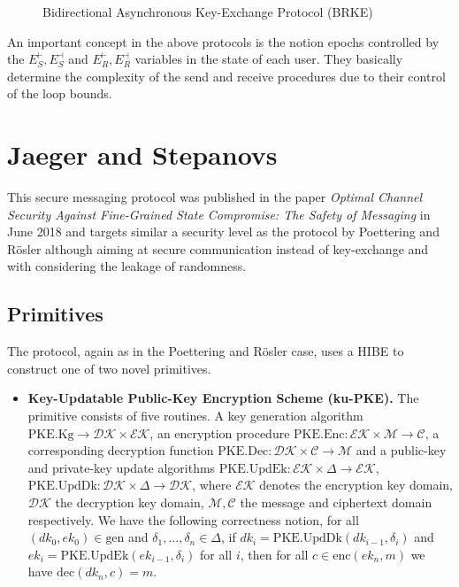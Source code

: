 \documentclass[11pt,a4paper,twoside,openright,bibliography=totoc]{scrbook}
\renewcommand{\t}{\text} %
\begin{document}

\begin{figure}[ht]
  \centering
  \setlength{\fboxsep}{10pt}
  \scalebox{0.9}{%
    \fbox{%
      
    }
  }
  \caption{Bidirectional Asynchronous Key-Exchange Protocol (BRKE)}
  \label{fig:brke}
\end{figure}

An important concept in the above protocols is the notion epochs
controlled by the $E_S^\vdash,E_S^\dashv$ and $E_R^\vdash,E_R^\dashv$
variables in the state of each user. They basically determine
the complexity of the send and receive procedures due to their
control of the loop bounds.


\section[Jaeger and Stepanovs]{Jaeger and Stepanovs~\cite{jaeger2018optimal}}
\label{sec:jaeger-stepanovs}

This secure messaging protocol was published in the paper
\textit{Optimal Channel Security Against Fine-Grained State Compromise: The Safety of Messaging}
in June 2018 and targets similar a security level as the protocol by
Poettering and Rösler although aiming at secure communication instead
of key-exchange and with considering the leakage of randomness.

\subsection{Primitives}
\label{sec:primitives-1}

The protocol, again as in the Poettering and Rösler case, uses a HIBE to construct
one of two novel primitives.
\begin{itemize}
\item \textbf{Key-Updatable Public-Key Encryption Scheme (ku-PKE).} The primitive
  consists of five routines. A key generation algorithm
  $\t{PKE.Kg} \rightarrow \mathcal{DK} \times \mathcal{EK}$, an encryption
  procedure $\t{PKE.Enc}: \mathcal{EK} \times \mathcal{M} \rightarrow \mathcal{C}$,
  a corresponding decryption function
  $\t{PKE.Dec}: \mathcal{DK} \times \mathcal{C} \rightarrow \mathcal{M}$ and
  a public-key and private-key update algorithms
  $\t{PKE.UpdEk}: \mathcal{EK} \times \Delta \rightarrow \mathcal{EK}$,
  $\t{PKE.UpdDk}: \mathcal{DK} \times \Delta \rightarrow \mathcal{DK}$, where
  $\mathcal{EK}$ denotes the encryption key domain, $\mathcal{DK}$ the
  decryption key domain, $\mathcal{M}, \mathcal{C}$ the message and
  ciphertext domain respectively. We have the following correctness notion, for all
  $(dk_0, ek_0) \in \t{gen}$ and $\delta_1,...,\delta_n \in \Delta$, if
  $dk_i = \t{PKE.UpdDk}(dk_{i-1},\delta_i)$ and
  $ek_i = \t{PKE.UpdEk}(ek_{i-1},\delta_i)$ for all $i$, then for all
  $c \in \t{enc}(ek_n,m)$ we have $\t{dec}(dk_n,c)=m$.
\end{itemize}
\end{document}
